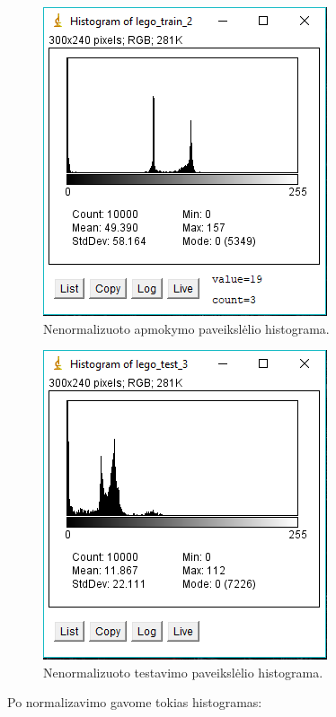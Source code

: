 \documentclass{VUMIFInfKursinis}
\begin{document}
\begin{enumerate}
    \begin{figure}[h!]
    \centering
      \includegraphics[scale=1.0]{img/histogram_train_1}
      \caption{Nenormalizuoto apmokymo paveikslėlio histograma.}
      \label{fig:histogram_train_1}
    \end{figure}
    
    \begin{figure}[h!]
    \centering
      \includegraphics[scale=1.0]{img/histogram_test_1}
      \caption{Nenormalizuoto testavimo paveikslėlio histograma.}
      \label{fig:histogram_test_1}
    \end{figure}
    
    \newpage
    Po normalizavimo gavome tokias histogramas:
    

\end{enumerate}
\end{document}
